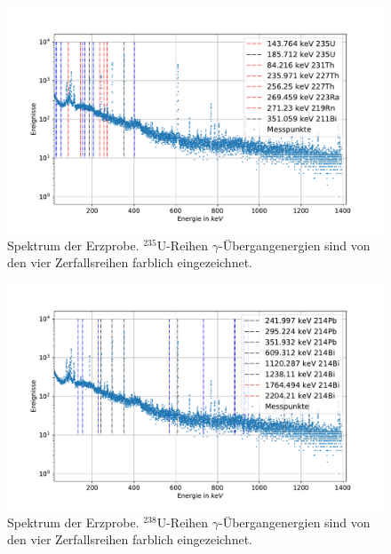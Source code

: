 \documentclass[
	a4paper,
	12pt,
	pagesize,
	ngerman
]{scrartcl}
\begin{document}
	\begin{figure}[H]
			\includegraphics[width= 1 \linewidth]{img/erz_U-Ac}
			\caption{
			Spektrum der Erzprobe. $^{235}$U-Reihen $\gamma$-Übergangenergien sind von den vier Zerfallsreihen farblich eingezeichnet.
			}
			\label{fg_erz_u_ac}
	\end{figure}
	\begin{figure}[H]
			\includegraphics[width= 1 \linewidth]{img/erz_U-Ra}
			\caption{
			Spektrum der Erzprobe. $^{238}$U-Reihen $\gamma$-Übergangenergien sind von den vier Zerfallsreihen farblich eingezeichnet.
			}
			\label{fg_erz_u_ra}
	\end{figure}
	\printbibliography
\end{document}
